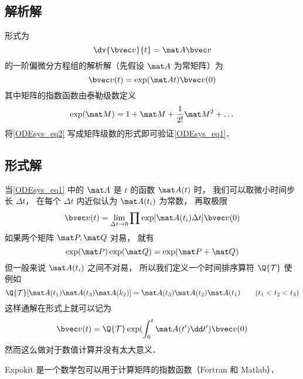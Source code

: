 

\subsection{解析解}
形式为
\begin{equation}\label{ODEsys_eq1}
\dv{\bvec v}{t} = \mat A \bvec v
\end{equation}
的一阶偏微分方程组的解析解（先假设 $\mat A$ 为常矩阵）为
\begin{equation}\label{ODEsys_eq2}
\bvec v(t) = \exp(\mat At) \bvec v(0)
\end{equation}
其中矩阵的指数函数由泰勒级数定义
\begin{equation}
\exp(\mat M) = 1 + \mat M + \frac1{2!} \mat M^2 + \dots
\end{equation}
将\autoref{ODEsys_eq2} 写成矩阵级数的形式即可验证\autoref{ODEsys_eq1}．

\subsection{形式解}
当\autoref{ODEsys_eq1} 中的 $\mat A$ 是 $t$ 的函数 $\mat A(t)$ 时， 我们可以取微小时间步长 $\Delta t$， 在每个 $\Delta t$ 内近似认为 $\mat A(t_i)$ 为常数， 再取极限
\begin{equation}
\bvec v(t) = \lim_{\Delta t \to 0} \prod \exp[\mat A(t_i)\Delta t] \bvec v(0)
\end{equation}
如果两个矩阵 $\mat P, \mat Q$ 对易， 就有
\begin{equation}
\exp(\mat P)\exp(\mat Q) = \exp(\mat P + \mat Q)
\end{equation}
但一般来说 $\mat A(t_i)$ 之间不对易， 所以我们定义一个时间排序算符 $\Q{\mathcal T}$ 使例如
\begin{equation}
\Q {\mathcal T} [\mat A(t_1) \mat A(t_3) \mat A(k_2)] = \mat A(t_3) \mat A(t_2) \mat A(t_1) \qquad ( t_1 < t_2 < t_3 )
\end{equation}
这样通解在形式上就可以记为
\begin{equation}\label{ODEsys_eq3}
\bvec v(t) = \Q {\mathcal T} \exp(\int_0^ t \mat A(t')\dd t') \bvec v(0)
\end{equation}
然而这么做对于数值计算并没有太大意义．

Expokit 是一个数学包可以用于计算矩阵的指数函数（Fortran 和 Matlab）．

